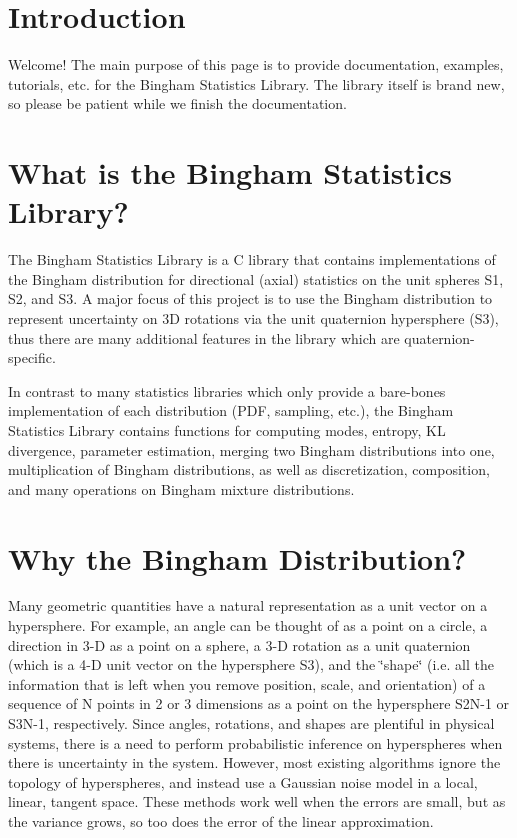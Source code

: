 \hypertarget{index_intro}{}\section{Introduction}\label{index_intro}
Welcome! The main purpose of this page is to provide documentation, examples, tutorials, etc. for the Bingham Statistics Library. The library itself is brand new, so please be patient while we finish the documentation.\hypertarget{index_what}{}\section{What is the Bingham Statistics Library?}\label{index_what}
The Bingham Statistics Library is a C library that contains implementations of the Bingham distribution for directional (axial) statistics on the unit spheres S1, S2, and S3. A major focus of this project is to use the Bingham distribution to represent uncertainty on 3D rotations via the unit quaternion hypersphere (S3), thus there are many additional features in the library which are quaternion-\/specific.

In contrast to many statistics libraries which only provide a bare-\/bones implementation of each distribution (PDF, sampling, etc.), the Bingham Statistics Library contains functions for computing modes, entropy, KL divergence, parameter estimation, merging two Bingham distributions into one, multiplication of Bingham distributions, as well as discretization, composition, and many operations on Bingham mixture distributions.\hypertarget{index_why}{}\section{Why the Bingham Distribution?}\label{index_why}
Many geometric quantities have a natural representation as a unit vector on a hypersphere. For example, an angle can be thought of as a point on a circle, a direction in 3-\/D as a point on a sphere, a 3-\/D rotation as a unit quaternion (which is a 4-\/D unit vector on the hypersphere S3), and the \char`\"{}shape\char`\"{} (i.e. all the information that is left when you remove position, scale, and orientation) of a sequence of N points in 2 or 3 dimensions as a point on the hypersphere S2N-\/1 or S3N-\/1, respectively. Since angles, rotations, and shapes are plentiful in physical systems, there is a need to perform probabilistic inference on hyperspheres when there is uncertainty in the system. However, most existing algorithms ignore the topology of hyperspheres, and instead use a Gaussian noise model in a local, linear, tangent space. These methods work well when the errors are small, but as the variance grows, so too does the error of the linear approximation.

